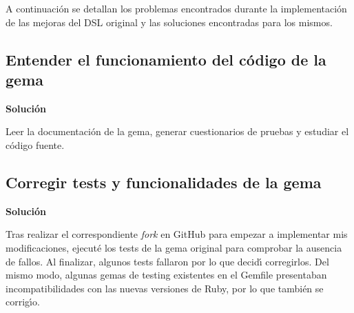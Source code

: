 A continuaci\'on se detallan los problemas encontrados durante la implementaci\'on de las mejoras del DSL original y las soluciones
encontradas para los mismos.

\subsection{Entender el funcionamiento del c\'odigo de la gema}
\label{subsec:3.1.1}
\bigskip

{\normalsize {\bfseries Soluci\'on}}
\bigskip

Leer la documentaci\'on de la gema, generar cuestionarios de pruebas y estudiar el c\'odigo fuente.

\subsection{Corregir tests y funcionalidades de la gema}
\label{subsec:3.1.2}
\bigskip

{\normalsize {\bfseries Soluci\'on}}
\bigskip

Tras realizar el correspondiente \textit{fork} en GitHub para empezar a implementar mis modificaciones, ejecut\'e los tests de la 
gema original para comprobar la ausencia de fallos. Al finalizar, algunos tests fallaron por lo que decid\'{\i} corregirlos. Del 
mismo modo, algunas gemas de testing existentes en el Gemfile presentaban incompatibilidades con las nuevas versiones de Ruby, por
lo que tambi\'en se corrig\'{\i}o.
\bigskip
